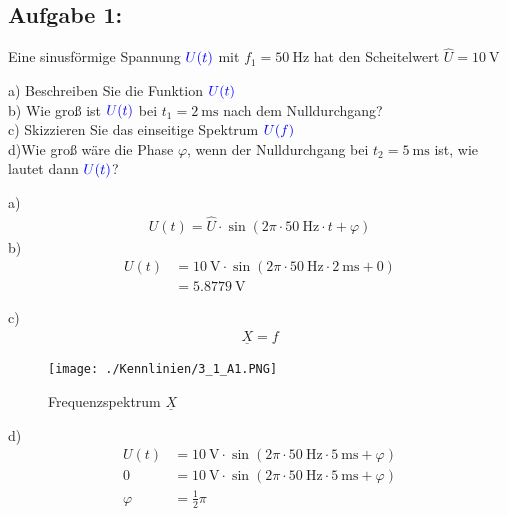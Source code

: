 \documentclass[a4paper,titlepage,parskip]{scrreprt}
\newcommand{\spannung}[1]{\textcolor{blue}{#1}}
\begin{document}
            \subsection{Aufgabe 1:}
                 Eine sinusförmige Spannung $\spannung{U(t)}$ mit $f_1 = \SI{50}{\hertz}$ hat den Scheitelwert $\hat{U} = \SI{10}{\volt}$
                 
                 a) Beschreiben Sie die Funktion $\spannung{U(t)}$\\
                 b) Wie groß ist  $\spannung{U(t)}$ bei $t_1 = \SI{2}{\milli\second}$ nach dem Nulldurchgang?\\
                 c) Skizzieren Sie das einseitige Spektrum $\spannung{U(f)}$\\
                 d)Wie groß wäre die Phase $\varphi$, wenn der Nulldurchgang bei $t_2 = \SI{5}{\milli\second}$ ist, wie lautet dann $\spannung{U(t)}$? 
                
                a)
                \begin{align*}
                    U(t) = \hat{U} \cdot \sin\left(2\pi \cdot \SI{50}{\hertz} \cdot t + \varphi \right)
                \end{align*}
                b)
                 \begin{align*}
                    U(t) &= \SI{10}{\volt} \cdot \sin\left(2\pi \cdot \SI{50}{\hertz} \cdot \SI{2}{\milli\second} + 0 \right)\\
                    &= \SI{5,8779}{\volt}
                \end{align*}
                \pagebreak
                
                
                c)
                \begin{align*}
                    \underline{X} = f
                \end{align*}
                					\begin{figure}[!htbp]
                                        \begin{center}
                                            \texttt{[image: ./Kennlinien/3\_1\_A1.PNG]}
                                        \end{center}
                                        \caption{Frequenzspektrum $\underline{X}$}
                                        \label{fig:3_1_A1}
                                    \end{figure}
                                    
               d)
                \begin{align*}
                     U(t) &= \SI{10}{\volt} \cdot \sin\left(2\pi \cdot \SI{50}{\hertz} \cdot \SI{5}{\milli\second} + \varphi \right)\\
                     0 &= \SI{10}{\volt} \cdot \sin\left(2\pi \cdot \SI{50}{\hertz} \cdot \SI{5}{\milli\second} + \varphi \right)\\
                     \varphi &=  \frac12\pi
                \end{align*}
                
\end{document}
